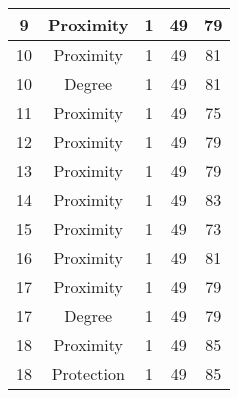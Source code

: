 \documentclass[results.tex]{subfiles}
\begin{document}
\begin{center}
\begin{tabular}{| c || c | c | c | c |}
            \hline
            9                       & Proximity                    & 1                      & 49                      & 79                   \\
            \hline
            10                      & Proximity                    & 1                      & 49                      & 81                   \\
            \hline
            10                      & Degree                       & 1                      & 49                      & 81                   \\
            \hline
            11                      & Proximity                    & 1                      & 49                      & 75                   \\
            \hline
            12                      & Proximity                    & 1                      & 49                      & 79                   \\
            \hline
            13                      & Proximity                    & 1                      & 49                      & 79                   \\
            \hline
            14                      & Proximity                    & 1                      & 49                      & 83                   \\
            \hline
            15                      & Proximity                    & 1                      & 49                      & 73                   \\
            \hline
            16                      & Proximity                    & 1                      & 49                      & 81                   \\
            \hline
            17                      & Proximity                    & 1                      & 49                      & 79                   \\
            \hline
            17                      & Degree                       & 1                      & 49                      & 79                   \\
            \hline
            18                      & Proximity                    & 1                      & 49                      & 85                   \\
            \hline
            18                      & Protection                   & 1                      & 49                      & 85                   \\

\end{tabular}
\end{center}
\end{document}
